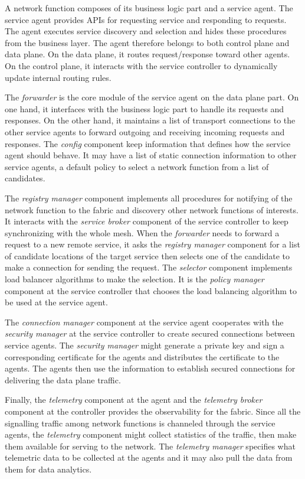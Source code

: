 \documentclass[conference]{IEEEtran}
\begin{document}
A network function composes of its business logic part and a service agent.
The service agent provides APIs for requesting service and responding to
requests. The agent executes service discovery and selection and hides these
procedures from the business layer. The agent therefore belongs to both control
plane and data plane. On the data plane, it routes request/response toward
other agents. On the control plane, it interacts with the service controller to
dynamically update internal routing rules.

The \textit{forwarder} is the core module of the service agent on the data
plane part. On one hand, it interfaces with the business logic part to handle
its requests and responses. On the other hand, it maintains a list of transport
connections to the other service agents to forward outgoing and receiving
incoming requests and responses. The \textit{config} component keep
information that defines how the service agent should behave. It may have a
list of static connection information to other service agents, a default policy
to select a network function from a list of candidates.

The \textit{registry manager} component implements all procedures for
notifying of the network function to the fabric and discovery other network
functions of interests. It interacts with the \textit{service broker} component
of the service controller to keep synchronizing with the whole mesh. When the
\textit{forwarder} needs to forward a request to a new remote service, it asks
the \textit{registry manager} component for a list of candidate
locations of the target service then selects one of the candidate to make a
connection for sending the request. The \textit{selector} component implements
load balancer algorithms to make the selection. It is the \textit{policy
manager} component at the service controller that chooses the load balancing
algorithm to be used at the service agent.

The \textit{connection manager} component at the service agent cooperates with
the \textit{security manager} at the service controller to create secured
connections between service agents. The \textit{security manager} might
generate a private key and sign a corresponding certificate for the agents and
distributes the certificate to the agents. The agents then use the information
to establish secured connections for delivering the data plane traffic.

Finally, the \textit{telemetry} component at the agent and the
\textit{telemetry broker} component at the controller provides the
observability for the fabric. Since all the signalling traffic among network
functions is channeled through the service agents, the \textit{telemetry}
component might collect statistics of the traffic, then make them available for
serving to the network. The \textit{telemetry manager} specifies what
telemetric data to be collected at the agents and it may also pull the data
from them for data analytics.
\end{document}
